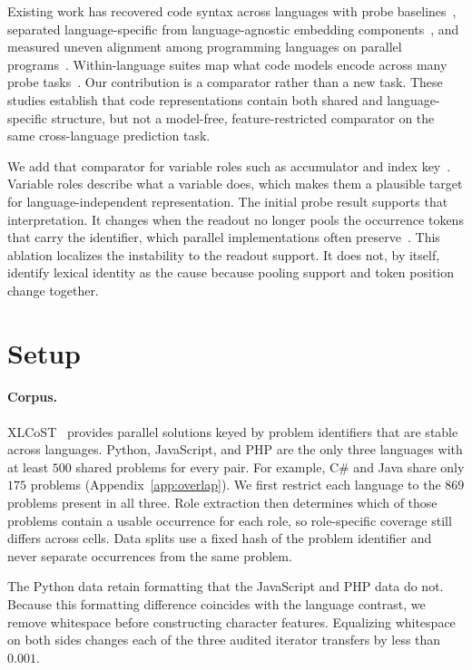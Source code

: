 \documentclass{article}
\begin{document}
Existing work has recovered code syntax across languages with probe
baselines~\citep{hernandezlopez2026syntactic}, separated language-specific from
language-agnostic embedding components~\citep{utpala2024language}, and measured
uneven alignment among programming languages on parallel
programs~\citep{kargaran2025programming}. Within-language suites map what code
models encode across many probe tasks~\citep{karmakar2021what,troshin2022probing,karmakar2024inspect}.
Our contribution is a comparator rather than a new task. These studies establish that code representations
contain both shared and language-specific structure, but not a model-free,
feature-restricted comparator on the same cross-language prediction task.

We add that comparator for variable roles such as accumulator and index
key~\citep{sajaniemi2002roles}. Variable roles describe what a variable does,
which makes them a plausible target for language-independent representation.
The initial probe result supports that interpretation. It changes when the
readout no longer pools the occurrence tokens that carry the identifier, which
parallel implementations often preserve~\citep{kargaran2025programming}. This
ablation localizes the instability to the readout support. It does not, by
itself, identify lexical identity as the cause because pooling support and
token position change together.

\section{Setup}

\paragraph{Corpus.}
XLCoST~\citep{zhu2022xlcost} provides parallel solutions keyed by problem
identifiers that are stable across languages. Python, JavaScript, and PHP are
the only three languages with at least $500$ shared problems for every pair.
For example, C\# and Java share only $175$ problems
(Appendix~\ref{app:overlap}). We first restrict each language to the $869$
problems present in all three. Role extraction then determines which of those
problems contain a usable occurrence for each role, so role-specific coverage
still differs across cells. Data splits use a fixed hash of the problem
identifier and never separate occurrences from the same problem.

The Python data retain formatting that the JavaScript and PHP data do not.
Because this formatting difference coincides with the language contrast, we
remove whitespace before constructing character features. Equalizing
whitespace on both sides changes each of the three audited iterator transfers
by less than $0.001$.
\end{document}
